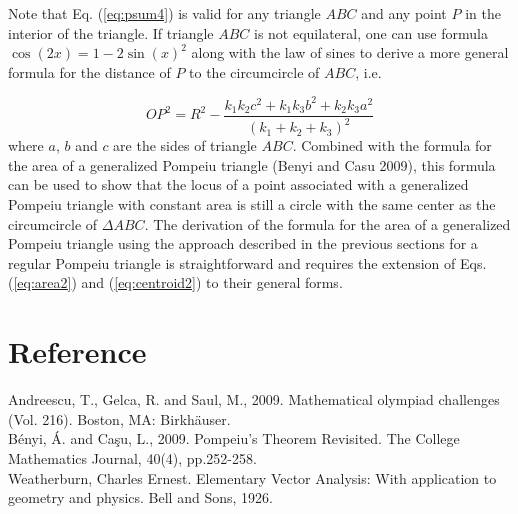 \documentclass[12pt]{article}
\begin{document}
Note that Eq. (\ref{eq:psum4}) is valid for any triangle $ABC$ and any point $P$ in the interior of the triangle. If triangle $ABC$ is not equilateral, one can use formula $\cos(2x)=1-2\sin(x)^2$ along with the law of sines to derive a more general formula for the distance of $P$ to the circumcircle of $ABC$, i.e.

\begin{equation}
OP^2=R^2-\frac{k_1k_2c^2+k_1k_3b^2+k_2k_3a^2}{(k_1+k_2+k_3)^2}
\label{eq:psum6}
\end{equation}
where $a$, $b$ and $c$ are the sides of triangle $ABC$.
Combined with the formula for the area of a generalized Pompeiu triangle (Benyi and Casu 2009), this formula can be used to show that the locus of a point associated with a generalized Pompeiu triangle with constant area is still a circle with the same center as the circumcircle of $\Delta ABC$. The derivation of the formula for the area of a generalized Pompeiu triangle using the approach described in the previous sections for a regular Pompeiu triangle is straightforward and requires the extension of Eqs. (\ref{eq:area2}) and (\ref{eq:centroid2}) to their general forms.  

\section{Reference}

Andreescu, T., Gelca, R. and Saul, M., 2009. Mathematical olympiad challenges (Vol. 216). Boston, MA: Birkhäuser.\\
Bényi, Á. and Caşu, L., 2009. Pompeiu's Theorem Revisited. The College Mathematics Journal, 40(4), pp.252-258.\\
Weatherburn, Charles Ernest. Elementary Vector Analysis: With application to geometry and physics. Bell and Sons, 1926.
\end{document}
